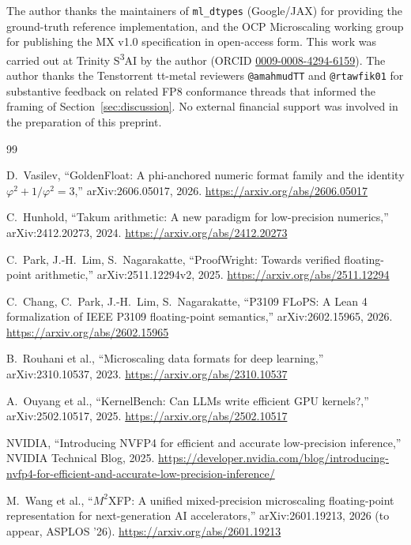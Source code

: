 \documentclass[11pt,letterpaper]{article}
\begin{document}
The author thanks the maintainers of \texttt{ml\_dtypes} (Google/JAX) for
providing the ground-truth reference implementation, and the OCP Microscaling
working group for publishing the MX v1.0 specification in open-access form.
This work was carried out at Trinity S\textsuperscript{3}AI by the author
(ORCID \href{https://orcid.org/0009-0008-4294-6159}{0009-0008-4294-6159}).
The author thanks the Tenstorrent tt-metal reviewers \texttt{@amahmudTT}
and \texttt{@rtawfik01} for substantive feedback on related FP8 conformance
threads that informed the framing of Section~\ref{sec:discussion}.  No
external financial support was involved in the preparation of this preprint.

\begin{thebibliography}{99}

D.~Vasilev,
``GoldenFloat: A phi-anchored numeric format family and the identity
$\varphi^{2} + 1/\varphi^{2} = 3$,''
arXiv:2606.05017, 2026.
\url{https://arxiv.org/abs/2606.05017}

C.~Hunhold,
``Takum arithmetic: A new paradigm for low-precision numerics,''
arXiv:2412.20273, 2024.
\url{https://arxiv.org/abs/2412.20273}

C.~Park, J.-H.~Lim, S.~Nagarakatte,
``ProofWright: Towards verified floating-point arithmetic,''
arXiv:2511.12294v2, 2025.
\url{https://arxiv.org/abs/2511.12294}

C.~Chang, C.~Park, J.-H.~Lim, S.~Nagarakatte,
``P3109 FLoPS: A Lean 4 formalization of IEEE P3109 floating-point semantics,''
arXiv:2602.15965, 2026.
\url{https://arxiv.org/abs/2602.15965}

B.~Rouhani et al.,
``Microscaling data formats for deep learning,''
arXiv:2310.10537, 2023.
\url{https://arxiv.org/abs/2310.10537}

A.~Ouyang et al.,
``KernelBench: Can LLMs write efficient GPU kernels?,''
arXiv:2502.10517, 2025.
\url{https://arxiv.org/abs/2502.10517}

NVIDIA,
``Introducing NVFP4 for efficient and accurate low-precision inference,''
NVIDIA Technical Blog, 2025.
\url{https://developer.nvidia.com/blog/introducing-nvfp4-for-efficient-and-accurate-low-precision-inference/}

M.~Wang et al.,
``$M^{2}$XFP: A unified mixed-precision microscaling floating-point representation for next-generation AI accelerators,''
arXiv:2601.19213, 2026 (to appear, ASPLOS '26).
\url{https://arxiv.org/abs/2601.19213}


\end{thebibliography}
\end{document}
